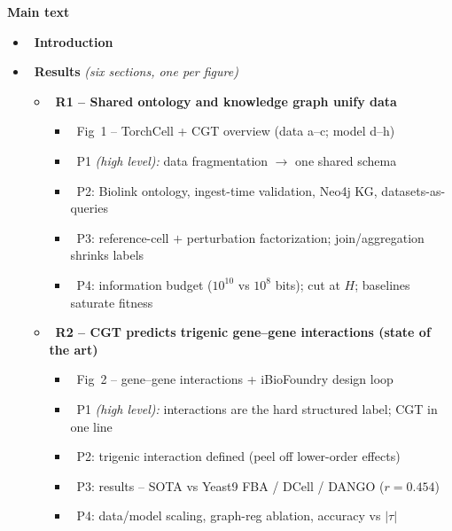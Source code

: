 \textbf{Main text}
\begin{itemize}\setlength{\itemsep}{0.3pt}\setlength{\topsep}{0.5pt}
  \item {}\ \textbf{Introduction}
  \item {}\ \textbf{Results} \emph{(six sections, one per figure)}
  \begin{itemize}\setlength{\itemsep}{0.8pt}\setlength{\topsep}{0.5pt}

    \item {}\ \textbf{R1 -- Shared ontology and knowledge graph unify data}
      \begin{itemize}\setlength{\itemsep}{0pt}
        \item {}\ Fig~1 -- TorchCell + CGT overview (data a--c; model d--h)
        \item {}\ P1 \emph{(high level):} data fragmentation $\to$ one shared schema
        \item {}\ P2: Biolink ontology, ingest-time validation, Neo4j KG, datasets-as-queries
        \item {}\ P3: reference-cell $+$ perturbation factorization; join/aggregation shrinks labels
        \item {}\ P4: information budget ($10^{10}$ vs $10^{8}$ bits); cut at $H$; baselines saturate fitness
      \end{itemize}

    \item {}\ \textbf{R2 -- CGT predicts trigenic gene--gene interactions (state of the art)}
      \begin{itemize}\setlength{\itemsep}{0pt}
        \item {}\ Fig~2 -- gene--gene interactions + iBioFoundry design loop
        \item {}\ P1 \emph{(high level):} interactions are the hard structured label; CGT in one line
        \item {}\ P2: trigenic interaction defined (peel off lower-order effects)
        \item {}\ P3: results -- SOTA vs Yeast9 FBA / DCell / DANGO ($r{=}0.454$)
        \item {}\ P4: data/model scaling, graph-reg ablation, accuracy vs $|\tau|$
      \end{itemize}


\end{itemize}
\end{itemize}
